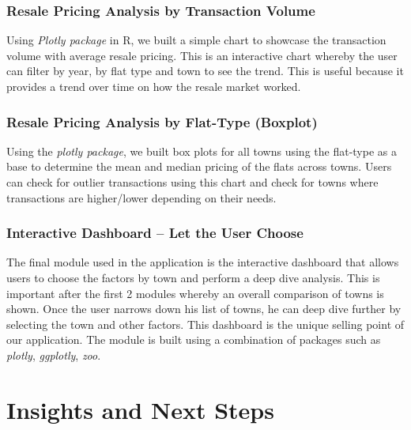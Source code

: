 \documentclass{acm_proc_article-sp}
\begin{document}
\hypertarget{resale-pricing-analysis-by-transaction-volume}{%
\subsubsection{Resale Pricing Analysis by Transaction
Volume}\label{resale-pricing-analysis-by-transaction-volume}}

Using \emph{Plotly package} in R, we built a simple chart to showcase
the transaction volume with average resale pricing. This is an
interactive chart whereby the user can filter by year, by flat type and
town to see the trend. This is useful because it provides a trend over
time on how the resale market worked.

\hypertarget{resale-pricing-analysis-by-flat-type-boxplot}{%
\subsubsection{Resale Pricing Analysis by Flat-Type
(Boxplot)}\label{resale-pricing-analysis-by-flat-type-boxplot}}

Using the \emph{plotly package}, we built box plots for all towns using
the flat-type as a base to determine the mean and median pricing of the
flats across towns. Users can check for outlier transactions using this
chart and check for towns where transactions are higher/lower depending
on their needs.

\hypertarget{interactive-dashboard-let-the-user-choose}{%
\subsubsection{Interactive Dashboard -- Let the User
Choose}\label{interactive-dashboard-let-the-user-choose}}

The final module used in the application is the interactive dashboard
that allows users to choose the factors by town and perform a deep dive
analysis. This is important after the first 2 modules whereby an overall
comparison of towns is shown. Once the user narrows down his list of
towns, he can deep dive further by selecting the town and other factors.
This dashboard is the unique selling point of our application. The
module is built using a combination of packages such as \emph{plotly},
\emph{ggplotly}, \emph{zoo}.

\hypertarget{insights-and-next-steps}{%
\section{Insights and Next Steps}\label{insights-and-next-steps}}
\end{document}
